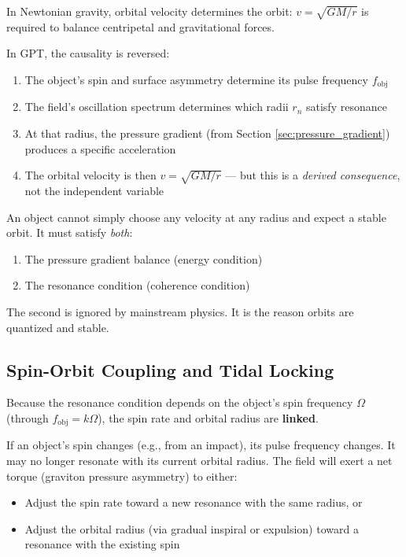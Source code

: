 \documentclass[12pt, a4paper]{article}
\begin{document}
In Newtonian gravity, orbital velocity determines the orbit: \( v = \sqrt{GM/r} \) is required to balance centripetal and gravitational forces.

In GPT, the causality is reversed:

\begin{enumerate}
    \item The object's spin and surface asymmetry determine its pulse frequency \( f_{\text{obj}} \)
    \item The field's oscillation spectrum determines which radii \( r_n \) satisfy resonance
    \item At that radius, the pressure gradient (from Section \ref{sec:pressure_gradient}) produces a specific acceleration
    \item The orbital velocity is then \( v = \sqrt{GM/r} \) — but this is a \textit{derived consequence}, not the independent variable
\end{enumerate}

An object cannot simply choose any velocity at any radius and expect a stable orbit. It must satisfy \textit{both}:
\begin{enumerate}
    \item The pressure gradient balance (energy condition)
    \item The resonance condition (coherence condition)
\end{enumerate}

The second is ignored by mainstream physics. It is the reason orbits are quantized and stable.

\subsection{Spin-Orbit Coupling and Tidal Locking}
\label{subsec:spin_orbit_coupling}

Because the resonance condition depends on the object's spin frequency \( \Omega \) (through \( f_{\text{obj}} = k\Omega \)), the spin rate and orbital radius are \textbf{linked}.

If an object's spin changes (e.g., from an impact), its pulse frequency changes. It may no longer resonate with its current orbital radius. The field will exert a net torque (graviton pressure asymmetry) to either:
\begin{itemize}
    \item Adjust the spin rate toward a new resonance with the same radius, or
    \item Adjust the orbital radius (via gradual inspiral or expulsion) toward a resonance with the existing spin
\end{itemize}
\end{document}
